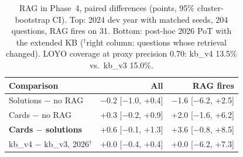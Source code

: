 \begin{table}[!t]
\centering
\scriptsize
\caption{RAG in Phase~4, paired differences (points, 95\% cluster-bootstrap CI). Top: 2024 dev year with matched seeds, 204 questions, RAG fires on 31. Bottom: post-hoc 2026 PoT with the extended KB ($^\dagger$right column: questions whose retrieval changed). LOYO coverage at proxy precision 0.70: kb\_v4 13.5\% vs.\ kb\_v3 15.0\%.}
\label{tab:v4rag}
\setlength{\tabcolsep}{2.5pt}
\begin{tabular}{lrr}
\toprule
Comparison & All & RAG fires \\
\midrule
Solutions $-$ no RAG & $-$0.2 [$-$1.0, +0.4] & $-$1.6 [$-$6.2, +2.5] \\
Cards $-$ no RAG & +0.3 [$-$0.2, +0.9] & +2.0 [$-$1.6, +6.2] \\
\textbf{Cards $-$ solutions} & +0.6 [$-$0.1, +1.3] & +3.6 [$-$0.8, +8.5] \\
\midrule
kb\_v4 $-$ kb\_v3, 2026$^\dagger$ & +0.0 [$-$0.4, +0.4] & +0.0 [$-$6.2, +7.3] \\
\bottomrule
\end{tabular}
\end{table}
